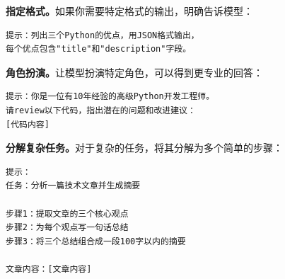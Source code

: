 \textbf{指定格式。}如果你需要特定格式的输出，明确告诉模型：

\begin{verbatim}
提示：列出三个Python的优点，用JSON格式输出，
每个优点包含"title"和"description"字段。
\end{verbatim}

\textbf{角色扮演。}让模型扮演特定角色，可以得到更专业的回答：

\begin{verbatim}
提示：你是一位有10年经验的高级Python开发工程师。
请review以下代码，指出潜在的问题和改进建议：
[代码内容]
\end{verbatim}

\textbf{分解复杂任务。}对于复杂的任务，将其分解为多个简单的步骤：

\begin{verbatim}
提示：
任务：分析一篇技术文章并生成摘要

步骤1：提取文章的三个核心观点
步骤2：为每个观点写一句话总结
步骤3：将三个总结组合成一段100字以内的摘要

文章内容：[文章内容]
\end{verbatim}
